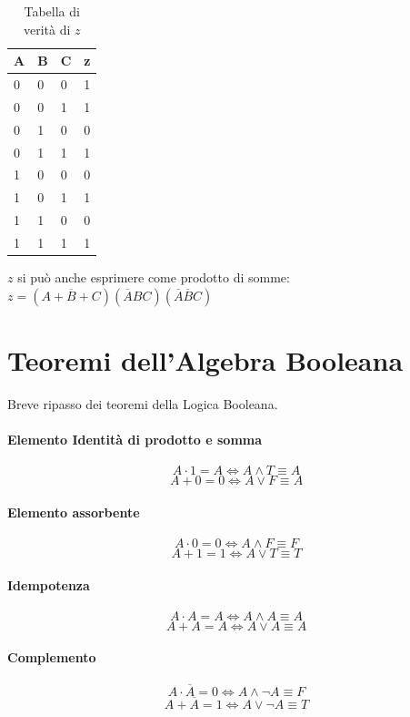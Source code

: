 \begin{table}[H]
	\centering
	\caption{Tabella di verità di $ z $}
	\label{tab:z-truth}
	\begin{tabular}{|l|l|l|l|}
		\hline
		A & B & C & z \\ \hline
		0                       & 0                      & 0 & 1 \\  
		0                       & 0                      & 1 & 1 \\ 
		0                       & 1                      & 0 & 0 \\ 
		0                       & 1                      & 1 & 1 \\ 
		1                       & 0                      & 0 & 0 \\ 
		1                       & 0                      & 1 & 1 \\  
		1                       & 1                      & 0 & 0 \\ 
		1                       & 1                      & 1 & 1 \\ \hline
	\end{tabular}
\end{table}




$ z $ si può anche esprimere come prodotto di somme: $ z = (A+\overbar{B}+C)(\overbar{A}BC)(\overbar{A}\overbar{B}C) $


\section{Teoremi dell'Algebra Booleana}
Breve ripasso dei teoremi della Logica Booleana.
\paragraph{Elemento Identità di prodotto e somma}
\[ A \cdot 1 = A \iff A \land T \equiv A\]
\[ A + 0 = 0 \iff A \lor F \equiv A\]
\paragraph{Elemento assorbente}
\[ A \cdot 0 = 0 \iff A \land F \equiv F \]
\[ A + 1 = 1 \iff A \lor T \equiv T \]
\paragraph{Idempotenza}
\[ A \cdot A = A \iff A \land A \equiv A \]
\[ A + A = A \iff A \lor A \equiv A \]
\paragraph{Complemento}
\[ A \cdot \overbar{A} = 0 \iff A \land \lnot A \equiv F \]
\[ A + \overbar{A} = 1 \iff A \lor \lnot A \equiv T \]
